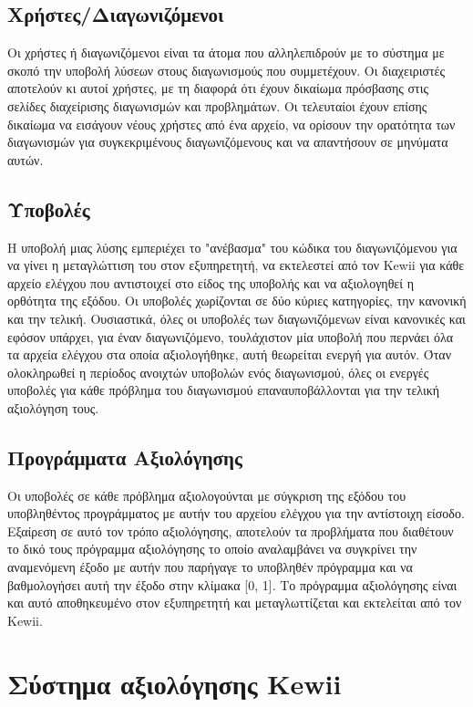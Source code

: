 \documentclass[diploma]{softlab-thesis}
\begin{document}
\subsection{Χρήστες/Διαγωνιζόμενοι}

Οι χρήστες ή διαγωνιζόμενοι είναι τα άτομα που αλληλεπιδρούν με το σύστημα με
σκοπό την υποβολή λύσεων στους διαγωνισμούς που συμμετέχουν. Οι διαχειριστές
αποτελούν κι αυτοί χρήστες, με τη διαφορά ότι έχουν δικαίωμα πρόσβασης στις
σελίδες διαχείρισης διαγωνισμών και προβλημάτων. Οι τελευταίοι έχουν επίσης
δικαίωμα να εισάγουν νέους χρήστες από ένα αρχείο, να ορίσουν την ορατότητα των
διαγωνισμών για συγκεκριμένους διαγωνιζόμενους και να απαντήσουν σε μηνύματα
αυτών.

\subsection{Υποβολές}

Η υποβολή μιας λύσης εμπεριέχει το "ανέβασμα" του κώδικα του διαγωνιζόμενου για
να γίνει η μεταγλώττιση του στον εξυπηρετητή, να εκτελεστεί από τον Kewii για
κάθε αρχείο ελέγχου που αντιστοιχεί στο είδος της υποβολής και να αξιολογηθεί η
ορθότητα της εξόδου. Οι υποβολές χωρίζονται σε δύο κύριες κατηγορίες, την
κανονική και την τελική. Ουσιαστικά, όλες οι υποβολές των διαγωνιζόμενων είναι
κανονικές και εφόσον υπάρχει, για έναν διαγωνιζόμενο, τουλάχιστον μία υποβολή
που περνάει όλα τα αρχεία ελέγχου στα οποία αξιολογήθηκε, αυτή θεωρείται ενεργή
για αυτόν. Όταν ολοκληρωθεί η περίοδος ανοιχτών υποβολών ενός διαγωνισμού, όλες
οι ενεργές υποβολές για κάθε πρόβλημα του διαγωνισμού επαναυποβάλλονται για την
τελική αξιολόγηση τους.

\subsection{Προγράμματα Αξιολόγησης}

Οι υποβολές σε κάθε πρόβλημα αξιολογούνται με σύγκριση της εξόδου του υποβληθέντος
προγράμματος με αυτήν του αρχείου ελέγχου για την αντίστοιχη είσοδο. Εξαίρεση σε
αυτό τον τρόπο αξιολόγησης, αποτελούν τα προβλήματα που διαθέτουν το δικό τους
πρόγραμμα αξιολόγησης το οποίο αναλαμβάνει να συγκρίνει την αναμενόμενη έξοδο
με αυτήν που παρήγαγε το υποβληθέν πρόγραμμα και να βαθμολογήσει αυτή την έξοδο
στην κλίμακα [0, 1]. Το πρόγραμμα αξιολόγησης είναι και αυτό αποθηκευμένο στον
εξυπηρετητή και μεταγλωττίζεται και εκτελείται από τον Kewii.


\section{Σύστημα αξιολόγησης Kewii}
\end{document}
